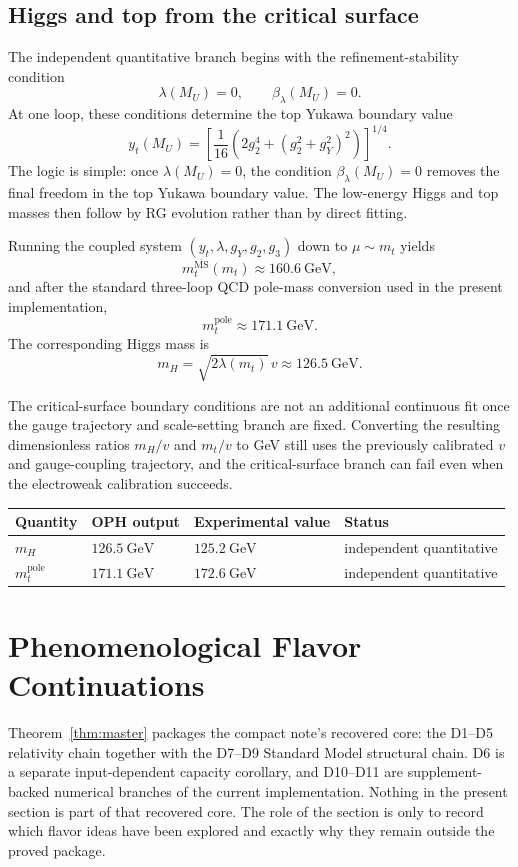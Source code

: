 \documentclass[11pt]{article}
\begin{document}
\subsection{Higgs and top from the critical surface}

The independent quantitative branch begins with the refinement-stability condition
\[
\lambda(M_U)=0,
\qquad
\beta_\lambda(M_U)=0.
\]
At one loop, these conditions determine the top Yukawa boundary value
\[
y_t(M_U)=
\left[\frac{1}{16}\left(2g_2^4+(g_2^2+g_Y^2)^2\right)\right]^{1/4}.
\]
The logic is simple: once $\lambda(M_U)=0$, the condition $\beta_\lambda(M_U)=0$ removes the final freedom in the top Yukawa boundary value. The low-energy Higgs and top masses then follow by RG evolution rather than by direct fitting.

Running the coupled system $(y_t,\lambda,g_Y,g_2,g_3)$ down to $\mu\sim m_t$ yields
\[
m_t^{\overline{\mathrm{MS}}}(m_t)\approx 160.6\ \mathrm{GeV},
\]
and after the standard three-loop QCD pole-mass conversion used in the present implementation,
\[
m_t^{\mathrm{pole}}\approx 171.1\ \mathrm{GeV}.
\]
The corresponding Higgs mass is
\[
m_H=\sqrt{2\lambda(m_t)}\,v\approx 126.5\ \mathrm{GeV}.
\]

The critical-surface boundary conditions are not an additional continuous fit once the gauge trajectory and scale-setting branch are fixed. Converting the resulting dimensionless ratios $m_H/v$ and $m_t/v$ to GeV still uses the previously calibrated $v$ and gauge-coupling trajectory, and the critical-surface branch can fail even when the electroweak calibration succeeds.

\begingroup
\footnotesize
\begin{tabular}{@{}p{}p{}p{}p{}@{}}
\toprule
Quantity & OPH output & Experimental value & Status \\
\midrule
$m_H$ & $126.5~\mathrm{GeV}$ & $125.2~\mathrm{GeV}$ & independent quantitative \\
$m_t^{\mathrm{pole}}$ & $171.1~\mathrm{GeV}$ & $172.6~\mathrm{GeV}$ & independent quantitative \\
\bottomrule
\end{tabular}
\endgroup

\section{Phenomenological Flavor Continuations}

Theorem~\ref{thm:master} packages the compact note's recovered core: the D1--D5 relativity chain together with the D7--D9 Standard Model structural chain. D6 is a separate input-dependent capacity corollary, and D10--D11 are supplement-backed numerical branches of the current implementation. Nothing in the present section is part of that recovered core. The role of the section is only to record which flavor ideas have been explored and exactly why they remain outside the proved package.
\end{document}
